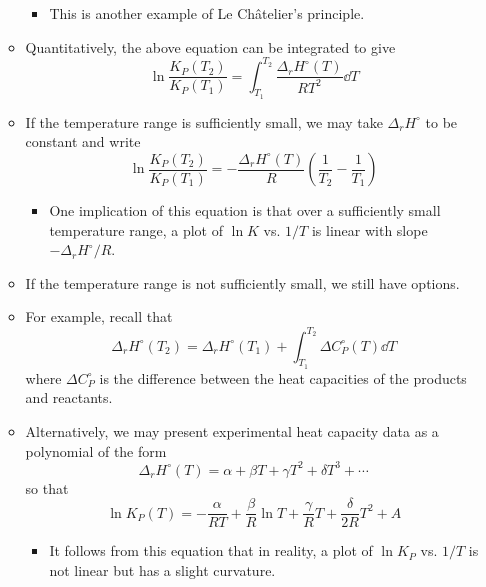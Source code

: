 \documentclass[../notes.tex]{subfiles}
\begin{document}
\begin{itemize}
\begin{itemize}
        \begin{itemize}
            \item This is another example of Le Ch\^{a}telier's principle.
        \end{itemize}
        \item Quantitatively, the above equation can be integrated to give
        \begin{equation*}
            \ln\frac{K_P(T_2)}{K_P(T_1)} = \int_{T_1}^{T_2}\frac{\Delta_rH^\circ(T)}{RT^2}\dd{T}
        \end{equation*}
        \item If the temperature range is sufficiently small, we may take $\Delta_rH^\circ$ to be constant and write
        \begin{equation*}
            \ln\frac{K_P(T_2)}{K_P(T_1)} = -\frac{\Delta_rH^\circ(T)}{R}\left( \frac{1}{T_2}-\frac{1}{T_1} \right)
        \end{equation*}
        \begin{itemize}
            \item One implication of this equation is that over a sufficiently small temperature range, a plot of $\ln K$ vs. $1/T$ is linear with slope $-\Delta_rH^\circ/R$.
        \end{itemize}
        \item If the temperature range is not sufficiently small, we still have options.
        \item For example, recall that
        \begin{equation*}
            \Delta_rH^\circ(T_2) = \Delta_rH^\circ(T_1)+\int_{T_1}^{T_2}\Delta C_P^\circ(T)\dd{T}
        \end{equation*}
        where $\Delta C_P^\circ$ is the difference between the heat capacities of the products and reactants.
        \item Alternatively, we may present experimental heat capacity data as a polynomial of the form
        \begin{equation*}
            \Delta_rH^\circ(T) = \alpha+\beta T+\gamma T^2+\delta T^3+\cdots
        \end{equation*}
        so that
        \begin{equation*}
            \ln K_P(T) = -\frac{\alpha}{RT}+\frac{\beta}{R}\ln T+\frac{\gamma}{R}T+\frac{\delta}{2R}T^2+A
        \end{equation*}
        \begin{itemize}
            \item It follows from this equation that in reality, a plot of $\ln K_P$ vs. $1/T$ is not linear but has a slight curvature.

\end{itemize}
\end{itemize}
\end{itemize}
\end{document}
